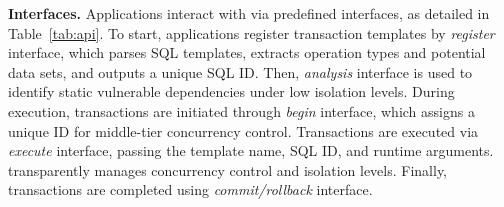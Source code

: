 
\noindent\textbf{Interfaces.} Applications interact with \sysname via predefined interfaces, as detailed in Table~\ref{tab:api}.
To start, applications register transaction templates by \textit{register} interface, which parses SQL templates, extracts operation types and potential data sets, and outputs a unique SQL ID. Then, \textit{analysis} interface is used to identify static vulnerable dependencies under low isolation levels.
During execution, transactions are initiated through \textit{begin} interface, which assigns a unique ID for middle-tier concurrency control. Transactions are executed via \textit{execute} interface, passing the template name, SQL ID, and runtime arguments. \sysname transparently manages concurrency control and isolation levels. Finally, transactions are completed using \textit{commit/rollback} interface.




